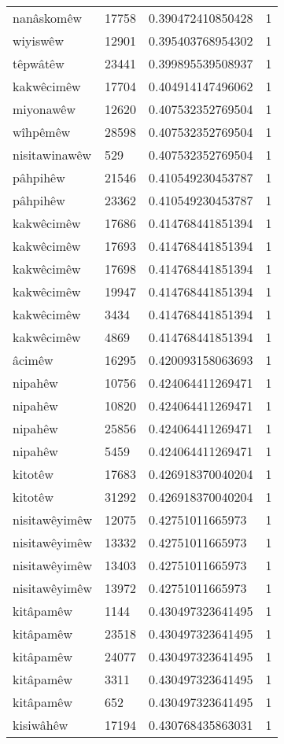 \begin{longtable}{llll}
nanâskomêw & 17758 & 0.390472410850428 & 1\\
wiyiswêw & 12901 & 0.395403768954302 & 1\\
têpwâtêw & 23441 & 0.399895539508937 & 1\\
kakwêcimêw & 17704 & 0.404914147496062 & 1\\
miyonawêw & 12620 & 0.407532352769504 & 1\\
wîhpêmêw & 28598 & 0.407532352769504 & 1\\
nisitawinawêw & 529 & 0.407532352769504 & 1\\
pâhpihêw & 21546 & 0.410549230453787 & 1\\
pâhpihêw & 23362 & 0.410549230453787 & 1\\
kakwêcimêw & 17686 & 0.414768441851394 & 1\\
kakwêcimêw & 17693 & 0.414768441851394 & 1\\
kakwêcimêw & 17698 & 0.414768441851394 & 1\\
kakwêcimêw & 19947 & 0.414768441851394 & 1\\
kakwêcimêw & 3434 & 0.414768441851394 & 1\\
kakwêcimêw & 4869 & 0.414768441851394 & 1\\
âcimêw & 16295 & 0.420093158063693 & 1\\
nipahêw & 10756 & 0.424064411269471 & 1\\
nipahêw & 10820 & 0.424064411269471 & 1\\
nipahêw & 25856 & 0.424064411269471 & 1\\
nipahêw & 5459 & 0.424064411269471 & 1\\
kitotêw & 17683 & 0.426918370040204 & 1\\
kitotêw & 31292 & 0.426918370040204 & 1\\
nisitawêyimêw & 12075 & 0.42751011665973 & 1\\
nisitawêyimêw & 13332 & 0.42751011665973 & 1\\
nisitawêyimêw & 13403 & 0.42751011665973 & 1\\
nisitawêyimêw & 13972 & 0.42751011665973 & 1\\
kitâpamêw & 1144 & 0.430497323641495 & 1\\
kitâpamêw & 23518 & 0.430497323641495 & 1\\
kitâpamêw & 24077 & 0.430497323641495 & 1\\
kitâpamêw & 3311 & 0.430497323641495 & 1\\
kitâpamêw & 652 & 0.430497323641495 & 1\\
kisiwâhêw & 17194 & 0.430768435863031 & 1\\

\end{longtable}
